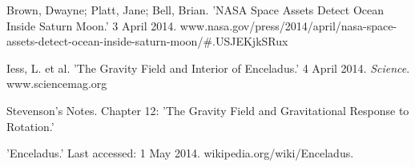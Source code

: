 \documentclass{article}
\begin{document}
\newpage

Brown, Dwayne; Platt, Jane; Bell, Brian. 'NASA Space Assets Detect Ocean
Inside Saturn Moon.' 3 April
2014. www.nasa.gov/press/2014/april/nasa-space-assets-detect-ocean-inside-saturn-moon/\#.USJEKjkSRux

Iess, L. et al. 'The Gravity Field and Interior of Enceladus.' 4 April
2014. \textit{Science}. www.sciencemag.org

Stevenson's Notes. Chapter 12: 'The Gravity Field and Gravitational Response to Rotation.'

'Enceladus.' Last accessed: 1 May 2014. wikipedia.org/wiki/Enceladus. 
\end{document}
